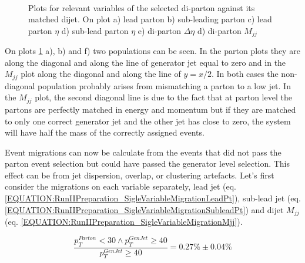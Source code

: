 \begin{figure}[!htp]
\\
\caption[]{Plots for relevant variables of the selected di-parton against its matched dijet. On plot a) lead parton \pt b) sub-leading parton \pt c) lead parton $\eta$ d) sub-lead parton $\eta$ e) di-parton $\Delta\eta$ d) di-parton $M_{jj}$}
\label{FIGURE:RunIIPreparation_VariablesPartonVsGenJet}
\end{figure}

On plots \ref{FIGURE:RunIIPreparation_VariablesPartonVsGenJet} a), b) and f) two populations can be seen. In the parton \pt plots they are along the diagonal and along the line of generator jet \pt equal to zero and in the $M_{jj}$ plot along the diagonal and along the line of $y=x/2$. In both cases the non-diagonal population probably arises from mismatching a parton to a low \pt jet. In the $M_{jj}$ plot, the second diagonal line is due to the fact that at parton level the partons are perfectly matched in energy and momentum but if they are matched to only one correct generator jet and the other jet has \pt close to zero, the system will have half the mass of the correctly assigned events.

Event migrations can now be calculate from the events that did not pass the parton event selection but could have passed the generator level selection. This effect can be from jet dispersion, overlap, or clustering artefacts. Let's first consider the migrations on each variable separately, lead jet \pt (eq. \ref{EQUATION:RunIIPreparation_SigleVariableMigrationLeadPt}), sub-lead jet \pt (eq. \ref{EQUATION:RunIIPreparation_SigleVariableMigrationSubleadPt}) and dijet $M_{jj}$ (eq. \ref{EQUATION:RunIIPreparation_SigleVariableMigrationMjj}).

\small
\begin{equation}
\label{EQUATION:RunIIPreparation_SigleVariableMigrationLeadPt}
\frac{p_{T}^{Parton}<30 \wedge p_{T}^{GenJet} \geq 40}{p_{T}^{GenJet} \geq 40}=0.27\% \pm 0.04\%
\end{equation}

